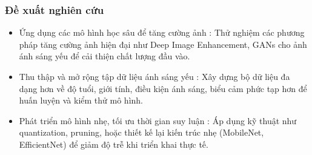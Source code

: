 \subsubsection{Đề xuất nghiên cứu}
\begin{itemize}
    \item Ứng dụng các mô hình học sâu để tăng cường ảnh : Thử nghiệm các phương pháp tăng cường ảnh hiện đại như Deep Image Enhancement, GANs cho ảnh ánh sáng yếu để cải thiện chất lượng đầu vào.
    \item Thu thập và mở rộng tập dữ liệu ánh sáng yếu : Xây dựng bộ dữ liệu đa dạng hơn về độ tuổi, giới tính, điều kiện ánh sáng, biểu cảm phức tạp hơn để huấn luyện và kiểm thử mô hình.
    \item Phát triển mô hình nhẹ, tối ưu thời gian suy luận : Áp dụng kỹ thuật như quantization, pruning, hoặc thiết kế lại kiến trúc nhẹ (MobileNet, EfficientNet) để giảm độ trễ khi triển khai thực tế.
\end{itemize}

